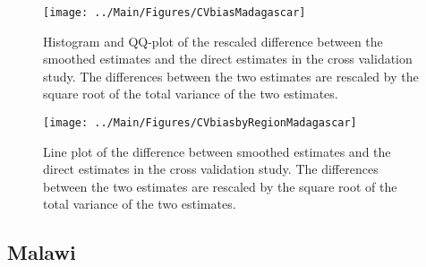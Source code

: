 \documentclass[12pt]{article}\usepackage[]{graphicx}\usepackage[]{color}
\newenvironment{knitrout}{}{} %
\begin{document}
\begin{knitrout}
\color{fgcolor}\begin{figure}[bht]

{\centering \texttt{[image: ../Main/Figures/CVbiasMadagascar]} 

}

\caption[Histogram and QQ-plot of the rescaled difference between the smoothed estimates and the direct estimates in the cross validation study]{Histogram and QQ-plot of the rescaled difference between the smoothed estimates and the direct estimates in the cross validation study. The differences between the two estimates are rescaled by the square root of the total variance of the two estimates.}\label{fig:unnamed-chunk-199}
\end{figure}


\end{knitrout}

\begin{knitrout}
\color{fgcolor}\begin{figure}[bht]

{\centering \texttt{[image: ../Main/Figures/CVbiasbyRegionMadagascar]} 

}

\caption[Line plot of the difference between smoothed estimates and the direct estimates in the cross validation study]{Line plot of the difference between smoothed estimates and the direct estimates in the cross validation study. The differences between the two estimates are rescaled by the square root of the total variance of the two estimates.}\label{fig:unnamed-chunk-200}
\end{figure}


\end{knitrout}


\clearpage
\subsection{Malawi}


\end{document}
